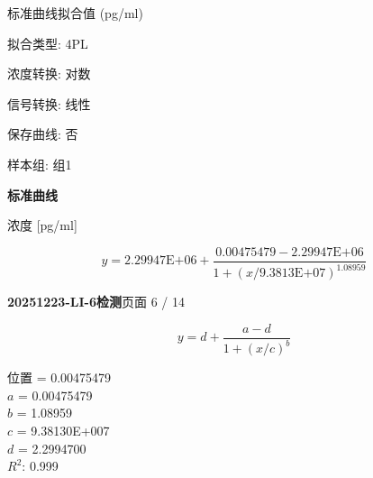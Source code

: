 \documentclass[UTF8,10pt,a4paper,fontset=fandol]{ctexart}
\begin{document}
\medskip
{}

\noindent\quad 标准曲线拟合值 (pg/ml)

\noindent\quad 拟合类型: 4PL

\noindent\quad 浓度转换: 对数

\noindent\quad 信号转换: 线性

\noindent\quad 保存曲线: 否

\noindent\quad 样本组: 组1

\bigskip
\begin{center}
\textbf{标准曲线}

\end{center}

\begin{center}
浓度 [pg/ml]
\end{center}

\noindent
\[
y=2.29947\mathrm{E}{+06}
+\frac{0.00475479-2.29947\mathrm{E}{+06}}
 {1+\left(x/9.3813\mathrm{E}{+07}\right)^{1.08959}}
\]

\newpage

\noindent\textbf{20251223-LI-6检测}\hfill 页面 6 / 14

\[
y=d+\frac{a-d}{1+(x/c)^b}
\]

\begin{flushleft}
位置 = 0.00475479\\
$a$ = 0.00475479\\
$b$ = 1.08959\\
$c$ = 9.38130E+007\\
$d$ = 2.2994700\\[0.5em]
$R^2$: 0.999
\end{flushleft}
\end{document}
